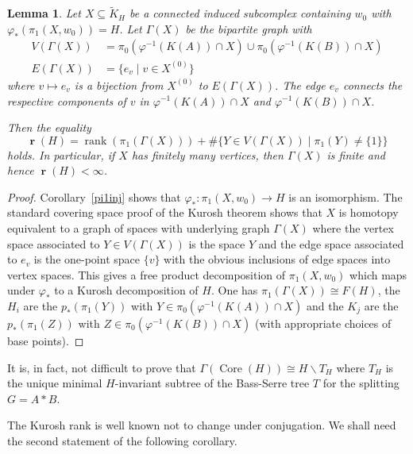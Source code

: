 \documentclass[11pt,reqno]{amsart}
\newtheorem{Lemma}[Thm]{Lemma}
\begin{document}
\begin{Lemma}\label{findKurosh}
Let $X\subseteq {\ensuremath{\widetilde {K}}}_H$ be a connected induced subcomplex containing $w_0$ with ${\varphi}_*(\pi_1(X,w_0))=H$.  Let $\Gamma(X)$ be the bipartite graph with
\begin{align*}
V(\Gamma(X)) &= \pi_0({{\varphi} {^{-1}}}(K(A))\cap X)\cup \pi_0({{\varphi} {^{-1}}} (K(B))\cap X)\\
E(\Gamma(X)) &= \{e_v\mid v\in X^{(0)}\}
\end{align*}
where $v\mapsto e_v$ is a bijection from $X^{(0)}$ to $E(\Gamma(X))$.  The edge $e_v$ connects the respective components of $v$ in ${{\varphi} {^{-1}}}(K(A))\cap X$ and ${{\varphi} {^{-1}}}(K(B))\cap X$.

Then the equality \[{\mathop{\boldsymbol{r}}}(H) = {\mathop{\mathrm{rank}}}(\pi_1(\Gamma(X)))+\#\{Y\in V(\Gamma(X))\mid \pi_1(Y)\neq \{1\}\}\] holds.  In particular, if $X$ has finitely many vertices, then $\Gamma(X)$ is finite and hence ${\mathop{\boldsymbol{r}}}(H)<\infty$.
\end{Lemma}
\begin{proof}
Corollary~\ref{pi1inj} shows that ${\varphi}_*\colon \pi_1(X,w_0){\rightarrow} H$ is an isomorphism.  The standard covering space proof of the Kurosh theorem shows that $X$ is homotopy equivalent to a graph of spaces  with underlying graph $\Gamma(X)$ where the vertex space associated to $Y\in V(\Gamma(X))$ is the space $Y$ and the edge space associated to $e_v$ is the one-point space $\{v\}$ with the obvious inclusions of edge spaces into vertex spaces.  This gives a free product decomposition of $\pi_1(X,w_0)$ which maps under ${\varphi}_*$ to a Kurosh decomposition of $H$.  One has $\pi_1(\Gamma(X))\cong F(H)$, the $H_i$ are the $p_*(\pi_1(Y))$ with $Y\in \pi_0({{\varphi} {^{-1}}}(K(A))\cap X)$ and the $K_j$ are the $p_*(\pi_1(Z))$ with $Z\in \pi_0({{\varphi} {^{-1}}}(K(B))\cap X)$ (with appropriate choices of base points).
\end{proof}

It is, in fact, not difficult to prove that $\Gamma({\mathop{\mathrm{Core}}\nolimits}(H))\cong H\backslash T_H$ where $T_H$ is the unique minimal $H$-invariant subtree of the Bass-Serre tree $T$ for the splitting $G=A\ast B$.

The Kurosh rank is well known not to change under conjugation.  We shall need the second statement of the following corollary.
\end{document}
